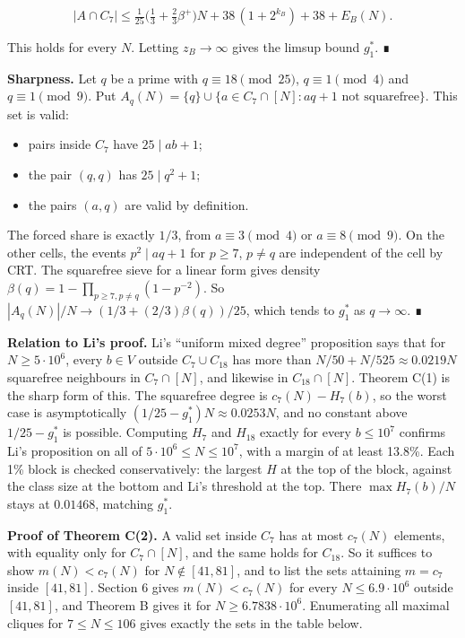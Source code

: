 \documentclass[
  11pt,
]{article}
\providecommand{\tightlist}{%
  \setlength{\itemsep}{0pt}\setlength{\parskip}{0pt}}
\begin{document}
\[|A\cap C_7| \le \tfrac1{25}\big(\tfrac13+\tfrac23\beta^{+}\big)N + 38\,(1+2^{k_B}) + 38 + E_B(N).\]

This holds for every \(N\). Letting \(z_B \to \infty\) gives the limsup
bound \(g_1^*\). ∎

\textbf{Sharpness.} Let \(q\) be a prime with \(q \equiv 18 \pmod{25}\),
\(q \equiv 1 \pmod{4}\) and \(q \equiv 1 \pmod{9}\). Put
\(A_q(N) = \{q\} \cup \{a \in C_7 \cap [N] : aq + 1 \text{ not squarefree}\}\).
This set is valid:

\begin{itemize}
\tightlist
\item
  pairs inside \(C_7\) have \(25 \mid ab + 1\);
\item
  the pair \((q, q)\) has \(25 \mid q^2 + 1\);
\item
  the pairs \((a, q)\) are valid by definition.
\end{itemize}

The forced share is exactly \(1/3\), from \(a \equiv 3 \pmod{4}\) or
\(a \equiv 8 \pmod{9}\). On the other cells, the events
\(p^2 \mid aq + 1\) for \(p \ge 7\), \(p \ne q\) are independent of the
cell by CRT. The squarefree sieve for a linear form gives density
\(\beta(q) = 1 - \prod_{p\ge 7, p\ne q}(1 - p^{-2})\). So
\(|A_q(N)|/N \to (1/3 + (2/3)\beta(q))/25\), which tends to \(g_1^*\) as
\(q \to \infty\). ∎

\textbf{Relation to Li's proof.} Li's ``uniform mixed degree''
proposition says that for \(N \ge 5\cdot 10^{6}\), every \(b \in V\)
outside \(C_7 \cup C_{18}\) has more than
\(N/50 + N/525 \approx 0.0219N\) squarefree neighbours in
\(C_7 \cap [N]\), and likewise in \(C_{18} \cap [N]\). Theorem C(1) is
the sharp form of this. The squarefree degree is \(c_7(N) - H_7(b)\), so
the worst case is asymptotically \((1/25 - g_1^*)N \approx 0.0253N\),
and no constant above \(1/25 - g_1^*\) is possible. Computing \(H_7\)
and \(H_{18}\) exactly for every \(b \le 10^{7}\) confirms Li's
proposition on all of \(5\cdot 10^{6} \le N \le 10^{7}\), with a margin
of at least 13.8\%. Each 1\% block is checked conservatively: the
largest \(H\) at the top of the block, against the class size at the
bottom and Li's threshold at the top. There \(\max H_7(b)/N\) stays at
\(0.01468\), matching \(g_1^*\).

\textbf{Proof of Theorem C(2).} A valid set inside \(C_7\) has at most
\(c_7(N)\) elements, with equality only for \(C_7 \cap [N]\), and the
same holds for \(C_{18}\). So it suffices to show \(m(N) < c_7(N)\) for
\(N \notin [41, 81]\), and to list the sets attaining \(m = c_7\) inside
\([41, 81]\). Section 6 gives \(m(N) < c_7(N)\) for every
\(N \le 6.9\cdot 10^{6}\) outside \([41, 81]\), and Theorem B gives it
for \(N \ge 6.7838\cdot 10^{6}\). Enumerating all maximal cliques for
\(7 \le N \le 106\) gives exactly the sets in the table below.
\end{document}
